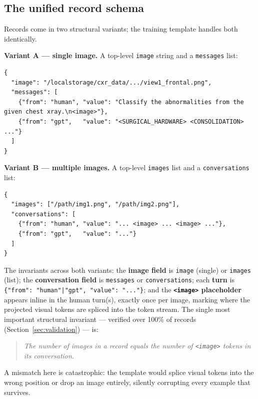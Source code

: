 \documentclass[11pt,a4paper]{article}
\begin{document}
\subsection{The unified record schema}
Records come in two structural variants; the training template handles both identically.

\textbf{Variant A --- single image.} A top-level \texttt{image} string and a \texttt{messages} list:
\begin{lstlisting}
{
  "image": "/localstorage/cxr_data/.../view1_frontal.png",
  "messages": [
    {"from": "human", "value": "Classify the abnormalities from the given chest xray.\n<image>"},
    {"from": "gpt",   "value": "<SURGICAL_HARDWARE> <CONSOLIDATION> ..."}
  ]
}
\end{lstlisting}

\textbf{Variant B --- multiple images.} A top-level \texttt{images} list and a \texttt{conversations} list:
\begin{lstlisting}
{
  "images": ["/path/img1.png", "/path/img2.png"],
  "conversations": [
    {"from": "human", "value": "... <image> ... <image> ..."},
    {"from": "gpt",   "value": "..."}
  ]
}
\end{lstlisting}

The invariants across both variants: the \textbf{image field} is \texttt{image} (single) or \texttt{images} (list); the \textbf{conversation field} is \texttt{messages} or \texttt{conversations}; each \textbf{turn} is \texttt{\{"from": "human"|"gpt", "value": "..."\}}; and the \textbf{\texttt{<image>} placeholder} appears inline in the human turn(s), exactly once per image, marking where the projected visual tokens are spliced into the token stream. The single most important structural invariant --- verified over 100\% of records (Section~\ref{sec:validation}) --- is:
\begin{quote}
\emph{The number of images in a record equals the number of \texttt{<image>} tokens in its conversation.}
\end{quote}
A mismatch here is catastrophic: the template would splice visual tokens into the wrong position or drop an image entirely, silently corrupting every example that survives.
\end{document}
